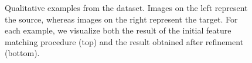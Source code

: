 \documentclass{article}
\begin{document}
\begin{figure}[t]
  \centering
  \hfill
  \hfill
  \caption{
    Qualitative examples from the  dataset.
    Images on the left represent the source, whereas images on the right represent the target.
    For each example, we visualize both the result of the initial feature matching procedure  (top) and the result obtained after refinement  (bottom).
  }\label{fig:willow_examples}
\end{figure}
\end{document}
